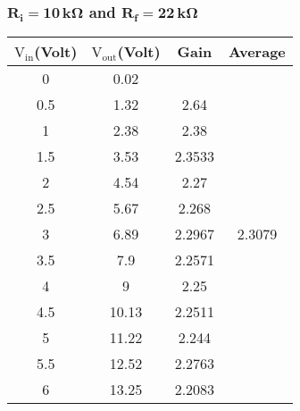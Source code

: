 \documentclass[12pt]{article}
\begin{document}
\subsubsection{$\mathbf{R_i = 10\, k \Omega}$ and $\mathbf{R_f = 22\, k \Omega}$}
\begin{table}[H]
	\centering
	\begin{tabular}{|c|c|c|c|}
		\hline
		$\mathrm{V_{in}}$(Volt) & $\mathrm{V_{out}}$(Volt) & Gain             & Average                            \\ \hline \hline
		0			 &0.02			&					& \multirow{13}{*}{2.3079} \\ \cline{1-3}
		0.5          & 1.32          & 2.64             & 						   \\ \cline{1-3}
		1            & 2.38          & 2.38             &                          \\ \cline{1-3}
		1.5          & 3.53          & 2.3533 			&                          \\ \cline{1-3}
		2            & 4.54          & 2.27             &                          \\ \cline{1-3}
		2.5          & 5.67          & 2.268            &                          \\ \cline{1-3}
		3            & 6.89          & 2.2967 			&                          \\ \cline{1-3}
		3.5          & 7.9           & 2.2571			&                          \\ \cline{1-3}
		4            & 9             & 2.25             &                          \\ \cline{1-3}
		4.5          & 10.13         & 2.2511		    &                          \\ \cline{1-3}
		5            & 11.22         & 2.244            &                          \\ \cline{1-3}
		5.5          & 12.52         & 2.2763 			&                          \\ \cline{1-3}
		6            & 13.25         & 2.2083 			&                          \\ \hline
	\end{tabular}
\end{table}
\end{document}
